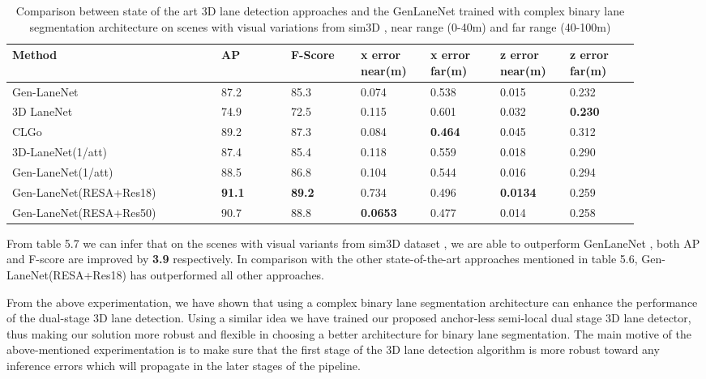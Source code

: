         \begin{table}[h]
    \centering
    \caption{Comparison between state of the art 3D lane detection approaches and the GenLaneNet \cite{guo2020gen} trained with complex binary lane segmentation architecture on scenes with visual variations from sim3D \cite{guo2020gen}, near range (0-40m) and far range (40-100m)\cite{guo2020gen}}
    \begin{tabular}{|p{0.3\linewidth}|p{0.1\linewidth}|p{0.1\linewidth}|p{0.1\linewidth}|p{0.1\linewidth}|p{0.1\linewidth}|p{0.1\linewidth}|}
    \hline
        \textbf{Method} & \textbf{AP} & \textbf{F-Score} & \textbf{x error near(m)} & \textbf{x error far(m)} & \textbf{z error near(m)} & \textbf{z error far(m)} \\ \hline
        Gen-LaneNet\cite{guo2020gen} & 87.2 & 85.3 & 0.074 & 0.538 & 0.015 & 0.232 \\ \hline
        3D LaneNet\cite{DBLP:journals/corr/abs-1811-10203} & 74.9 & 72.5 & 0.115 & 0.601 & 0.032 & \textbf{0.230} \\ \hline
        CLGo \cite{DBLP:journals/corr/abs-2112-15351}& 89.2 & 87.3 & 0.084 & \textbf{0.464} & 0.045 & 0.312 \\ \hline
        3D-LaneNet(1/att) \cite{9506296} & 87.4 & 85.4 & 0.118 & 0.559 & 0.018 & 0.290 \\ \hline
        Gen-LaneNet(1/att) \cite{9506296}& 88.5 & 86.8 & 0.104 & 0.544 & 0.016 & 0.294 \\ \hline
        Gen-LaneNet(RESA+Res18) & \textbf{ 91.1} &\textbf{ 89.2} & 0.734 & 0.496 & \textbf{0.0134} & 0.259 \\ \hline
        Gen-LaneNet(RESA+Res50) & 90.7 & 88.8 & \textbf{0.0653} & 0.477 & 0.014 & 0.258 \\ \hline
    \end{tabular}
\end{table}

 From table 5.7 we can infer that on the scenes with visual variants from sim3D dataset \cite{guo2020gen}, we are able to outperform GenLaneNet \cite{guo2020gen}, both AP and F-score are improved by \textbf{3.9} respectively. In comparison with the other state-of-the-art approaches mentioned in table 5.6, Gen-LaneNet(RESA+Res18) has outperformed all other approaches.
 
 From the above experimentation, we have shown that using a complex binary lane segmentation architecture can enhance the performance of the dual-stage 3D lane detection. Using a similar idea we have trained our proposed anchor-less semi-local dual stage 3D lane detector, thus making our solution more robust and flexible in choosing a better architecture for binary lane segmentation. The main motive of the above-mentioned experimentation is to make sure that the first stage of the 3D lane detection algorithm is more robust toward any inference errors which will propagate in the later stages of the pipeline. 

